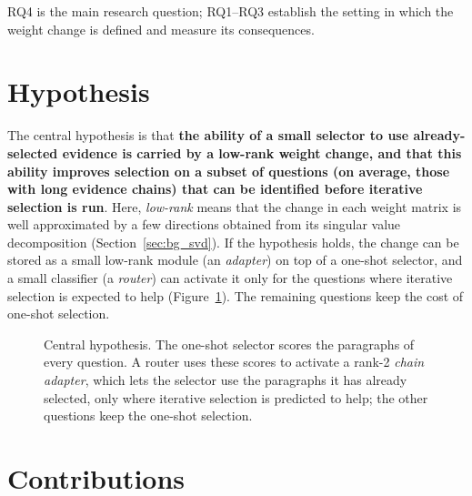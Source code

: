 RQ4 is the main research question; RQ1--RQ3 establish the setting in which the weight change is defined and measure its consequences.

\section{Hypothesis}

The central hypothesis is that \textbf{the ability of a small selector to use already-selected evidence is carried by a low-rank weight change, and that this ability improves selection on a subset of questions (on average, those with long evidence chains) that can be identified before iterative selection is run}. Here, \emph{low-rank} means that the change in each weight matrix is well approximated by a few directions obtained from its singular value decomposition (Section~\ref{sec:bg_svd}). If the hypothesis holds, the change can be stored as a small low-rank module (an \emph{adapter}) on top of a one-shot selector, and a small classifier (a \emph{router}) can activate it only for the questions where iterative selection is expected to help (Figure~\ref{fig:hypothesis}). The remaining questions keep the cost of one-shot selection.

\begin{figure}[htbp]
\centering
\resizebox{\textwidth}{!}{}
\caption{Central hypothesis. The one-shot selector scores the paragraphs of every question. A router uses these scores to activate a rank-2 \emph{chain adapter}, which lets the selector use the paragraphs it has already selected, only where iterative selection is predicted to help; the other questions keep the one-shot selection.}
\label{fig:hypothesis}
\end{figure}

\section{Contributions}

